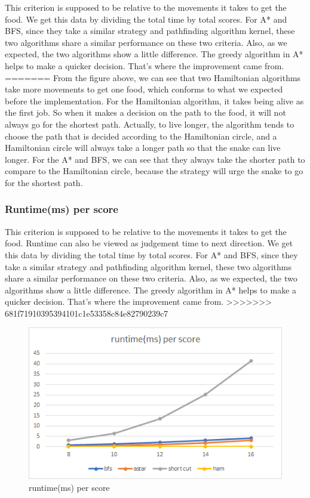 \documentclass[12pt]{article}
\begin{document}
This criterion is supposed to be relative to the movements it takes to get the food. We get 
this data by dividing the total time by total scores. For A* and BFS, since they take a similar 
strategy and pathfinding algorithm kernel, these two algorithms share a similar performance on 
these two criteria. Also, as we expected, the two algorithms show a little difference. The 
greedy algorithm in A* helps to make a quicker decision. That's where the improvement came from. 
=======
From the figure above, we can see that two Hamiltonian algorithms take more movements to get one food, which conforms to what we expected before the implementation. For the Hamiltonian algorithm, it takes being alive as the first job. So when it makes a decision on the path to the food, it will not always go for the shortest path. Actually, to live longer, the algorithm tends to choose the path that is decided according to the Hamiltonian circle, and a Hamiltonian circle will always take a longer path so that the snake can live longer. For the A* and BFS, we can see that they always take the shorter path to compare to the Hamiltonian circle, because the strategy will urge the snake to go for the shortest path. 

\subsubsection{Runtime(ms) per score}

This criterion is supposed to be relative to the movements it takes to get the food. Runtime can also be viewed as judgement time to next direction. We get this data by dividing the total time by total scores. For A* and BFS, since they take a similar strategy and pathfinding algorithm kernel, these two algorithms share a similar performance on these two criteria. Also, as we expected, the two algorithms show a little difference. The greedy algorithm in A* helps to make a quicker decision. That's where the improvement came from. 
>>>>>>> 681f71910395394101c1e53358c84e82790239c7

\begin{figure}[H]
    \centering 
    \includegraphics[scale = 0.9]{anay2.png}
    \caption{runtime(ms) per score}
\end{figure}
\end{document}
